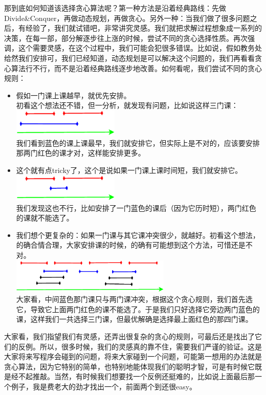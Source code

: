 	那到底如何知道该选择贪心算法呢？第一种方法是沿着经典路线：先做Divide\&Conquer，再做动态规划，再做贪心。另外一种：当我们做了很多问题之后，有经验了，我们就试错吧，非常讲究灵感。我们就把求解过程想象成一系列的决策，在每一部，部分解逐步往上涨的时候，尝试不同的贪心选择性质。再次强调，这个需要灵感，在这个过程中，我们可能会犯很多错误。比如说，假如教务处给然我们安排可，我们已经知道，动态规划是可以解决这个问题的，我们再看看贪心算法行不行，而不是沿着经典路线逐步地改善。如何看呢，我们尝试不同的贪心规则：
	\begin{itemize}
		\item
		假如一门课上课越早，就优先安排。\\
		初看这个想法还不错，但一分析，就发现有问题，比如说这样三门课：\\
		\includegraphics[width=2in]{L7-intervalschedulingexample-error2.eps}\\
		我们看到蓝色的课上课最早，我们就安排它，但实际上是不对的，应该要安排那两门红色的课才对，这样能安排更多。
		\item
		这个就有点tricky了，这个是说如果一门课上课时间短，我们就安排它。\\
		 \includegraphics[width=2in]{L7-intervalschedulingexample-error1.eps}\\
		 我们发现这也不行，比如安排了一门蓝色的课后（因为它历时短），两门红色的课就不能选了。
		 \item
		 我们想个更复杂的：如果一门课与其它课冲突很少，就越好。初看这个想法，的确合情合理，大家安排课的时候，的确有可能想到这个方法，可惜还是不对。\\
		 \includegraphics[width=3in]{L7-intervalschedulingexample-error3.eps}\\
		 大家看，中间蓝色那门课只与两门课冲突，根据这个贪心规则，我们首先选它，导致它上面两门红色的课不能选了。于是我们只好选择它旁边两门蓝色的课，这样我们一共选择三门课，但最优解确是选择最上面红色的那四门课。		
	\end{itemize}
	大家看，我们指望我们有灵感，还弄出很复杂的贪心的规则，可最后还是找出了它们的反例。所以，很多时候，我们的灵感真的靠不住，需要我们严谨的验证。这是大家将来写程序会碰到的问题，将来大家碰到一个问题，可能第一想用的办法就是贪心算法，因为它特别的简单，也特别地能体现我们的聪明才智，可是有时候它既是经不起推敲。当然，有时候我们想要找一个反例还挺难的，比如说上面最后那一个例子，我是费老大的劲才找出一个，前面两个到还很easy。
	
